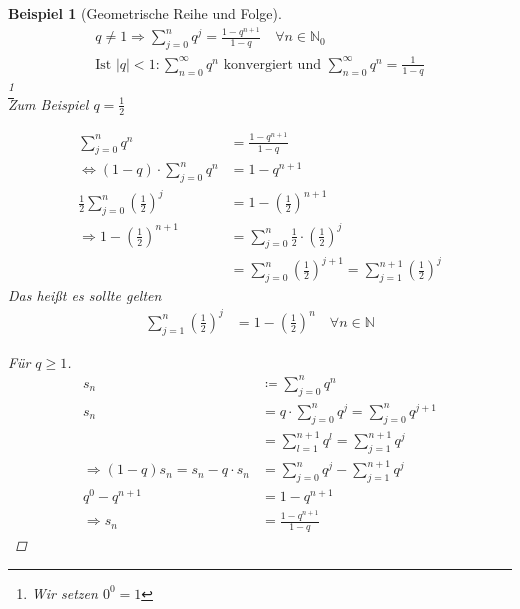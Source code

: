 \documentclass[11pt, twoside, a4paper]{article}
\theoremstyle{plain}
\newtheorem{beispiel}[blockelement]{Beispiel}
\newcommand{\pair}[1]{\left(#1\right)}
\newcommand{\abs}[1]{\left|#1\right|}
\newcommand{\equivalent}[0]{\Leftrightarrow{}}
\newcommand{\impl}[0]{\Rightarrow{}}
\newcommand{\definedas}[0]{\coloneqq}
\newcommand{\naturalnumbers}{\mathbb{N}}
\begin{document}
    \begin{beispiel}[Geometrische Reihe und Folge]
        \begin{align*}
            q\neq 1 \impl \sum_{j=0}^{n} q^j = \frac{1-q^{n+1}}{1-q}\quad\forall n\in\naturalnumbers_0\\
            \text{Ist } \abs{q} < 1\colon \sum_{n=0}^{\infty} q^n\text{ konvergiert und } \sum_{n=0}^{\infty} q^n = \frac{1}{1-q}\tag{geometrische Reihe}
        \end{align*}
        \footnote{Wir setzen $0^0 = 1$}\\
        Zum Beispiel $q=\frac{1}{2}$

        \begin{align*}
            \sum_{j=0}^{n} q^n &= \frac{1-q^{n+1}}{1-q}\\
            \equivalent \pair{1-q}\cdot \sum_{j=0}^{n} q^n &= 1-q^{n+1}\\
            \frac{1}{2}\sum_{j=0}^{n} \pair{\frac{1}{2}}^j &= 1 - \pair{\frac{1}{2}}^{n+1}\\
            \impl 1 - \pair{\frac{1}{2}}^{n+1} &= \sum_{j=0}^{n} \frac{1}{2}\cdot\pair{\frac{1}{2}}^j\\
            &= \sum_{j=0}^{n} \pair{\frac{1}{2}}^{j+1} = \sum_{j=1}^{n+1} \pair{\frac{1}{2}}^j
        \end{align*}
        Das heißt es sollte gelten
        \begin{align*}
            \sum_{j=1}^{n} \pair{\frac{1}{2}}^j &= 1-\pair{\frac{1}{2}}^n\quad \forall n\in\naturalnumbers
        \end{align*}

        \begin{proof}[Für $q\geq 1$]
            \begin{align*}
                s_n &\definedas \sum_{j=0}^{n} q^n\\
                s_n &= q\cdot \sum_{j=0}^{n} q^j = \sum_{j=0}^{n} q^{j+1}\\
                &= \sum_{l=1}^{n+1} q^l = \sum_{j=1}^{n+1} q^j\\
                \impl (1-q) s_n = s_n - q\cdot s_n &= \sum_{j=0}^{n}  q^j - \sum_{j=1}^{n+1} q^j\tag{Reißverschlusssumme}\\
                q^0 - q^{n+1} &= 1 - q^{n+1}\\
                \impl s_n &= \frac{1-q^{n+1}}{1-q}
            \end{align*}
        \end{proof}
    \end{beispiel}
\end{document}
